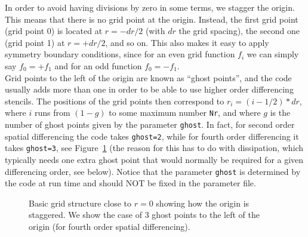 \documentclass[12pt]{article}
\begin{document}
In order to avoid having divisions by zero in some terms, we stagger
the origin.  This means that there is no grid point at the origin.
Instead, the first grid point (grid point 0) is located at $r=-dr/2$
(with $dr$ the grid spacing), the second one (grid point 1) at
$r=+dr/2$, and so on.  This also makes it easy to apply symmetry
boundary conditions, since for an even grid function $f_i$ we can
simply say $f_0=+f_1$ and for an odd function $f_0=-f_1$. \\

Grid points to the left of the origin are known as ``ghost points'',
and the code usually adds more than one in order to be able to use
higher order differencing stencils. The positions of the grid points
then correspond to $r_i = (i-1/2)*dr$, where $i$ runs from $(1-g)$ to
some maximum number \texttt{Nr}, and where $g$ is the number of ghost
points given by the parameter \texttt{ghost}.  In fact, for second
order spatial differencing the code takes \texttt{ghost=2}, while for
fourth order differencing it takes \texttt{ghost=3}, see
Figure~\ref{fig:grid} (the reason for this has to do with dissipation,
which typically needs one extra ghost point that would normally be
required for a given differencing order, see below). Notice that the
parameter \texttt{ghost} is determined by the code at run time and
should NOT be fixed in the parameter file. \\

\begin{figure}[t]
\begin{center}
\end{center}
\caption{Basic grid structure close to $r=0$ showing how the origin is
  staggered.  We show the case of 3 ghost points to the left of the
  origin (for fourth order spatial differencing).}
\label{fig:grid}
\end{figure}
\end{document}
